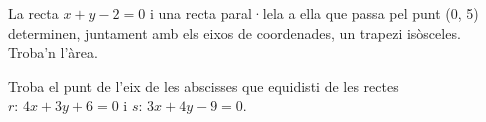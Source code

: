 \begin{activitats}
\begin{mylist}
	\exer  La recta $x+y-2=0$ i una recta paral·lela a ella que passa pel punt (0, 5) determinen, juntament amb els eixos de coordenades, un trapezi isòsceles. Troba'n l'àrea.

	
	\exer Troba el punt de l'eix de les abscisses que equidisti de les rectes $r:\, 4x+3y+6=0$ i $s:\, 3x+4y-9=0$.
	
	
\end{mylist}	
	
\end{activitats}	

\newpage


